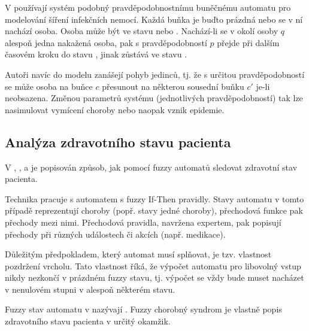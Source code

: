 \documentclass[a4paper,10pt]{article}
\begin{document}
V \cite{BocChe-CriBePrAuNetModSprInfDis+} používají systém podobný pravděpodobnostnímu buněčnému automatu pro modelování šíření infekčních nemocí. Každá buňka je buďto prázdná nebo se v ní nachází osoba. Osoba může být ve stavu  nebo . Nachází-li se v okolí  osoby $q$ alespoň jedna nakažená osoba, pak s pravděpodobností $p$ přejde při dalším časovém kroku do stavu , jinak zůstává ve stavu . 

Autoři navíc do modelu zanášejí pohyb jedinců, tj. že s určitou pravděpodobností se může osoba na buňce $c$ přesunout na některou sousední buňku $c'$ je-li neobsazena. Změnou parametrů systému (jednotlivých pravděpodobností) tak lze nasimulovat vymícení choroby nebo naopak vznik epidemie.



% 

\subsection{Analýza zdravotního stavu pacienta}
V \cite{Jia+-ExHeaSimMetBasIntHumTheMod}, \cite{GupRah-CliMonUsFuzSys}, \cite{CamMerNun-UsFuzAutDiagPrHeaPro} a \cite{SteAdl-CliMonFuzAut} je popisován způsob, jak pomocí fuzzy automatů sledovat zdravotní stav pacienta. 


Technika pracuje s automatem s fuzzy If-Then pravidly. Stavy automatu v tomto případě reprezentují choroby (popř. stavy jedné choroby), přechodová funkce pak přechody mezi nimi. Přechodová pravidla, navržena expertem, pak popisují přechody při různých událostech či akcích (např. medikace). 

Důležitým předpokladem, který automat musí splňovat, je tzv. vlastnost pozdržení vrcholu. Tato vlastnost říká, že výpočet automatu pro libovolný vstup nikdy nezkončí v prázdném fuzzy stavu, tj. výpočet se vždy bude muset nacházet v nenulovém stupni v alespoň některém stavu.


Fuzzy stav automatu v \cite{GupRah-CliMonUsFuzSys} nazývají . Fuzzy chorobný syndrom je vlastně popis zdravotního stavu pacienta v určitý okamžik. 
\end{document}

